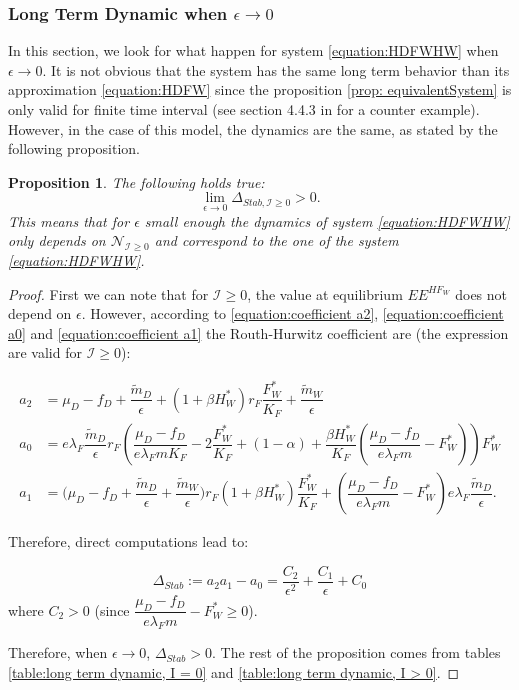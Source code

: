 \documentclass{article}
\newcommand{\lfw}{\lambda_{F}}
\newcommand{\lfw}{\lambda_{F}}
\newcommand{\cI}{\mathcal{I}}
\newtheorem{prop}{Proposition}
\begin{document}
\subsubsection{Long Term Dynamic when $\epsilon \rightarrow 0$}
In this section, we look for what happen for system \eqref{equation:HDFWHW} when $\epsilon \rightarrow 0$. It is not obvious that the system has the same long term behavior than its approximation \eqref{equation:HDFW} since the proposition \ref{prop: equivalentSystem} is only valid for finite time interval (see section 4.4.3 in \cite{banasiak_methods_2014} for a counter example). However, in the case of this model, the dynamics are the same, as stated by the following proposition.

\begin{prop}
The following holds true:
$$
\lim\limits_{ \epsilon \rightarrow 0}{\Delta_{Stab, \cI \geq 0}} > 0.
$$
This means that for $\epsilon$ small enough the dynamics of system \eqref{equation:HDFWHW} only depends on $\mathcal{N}_{\cI \geq 0}$ and correspond to the one of the system \eqref{equation:HDFWHW}.
\end{prop}
\begin{proof}
First we can note that for $\cI \geq 0$, the value at equilibrium $EE^{HF_W}$ does not depend on $\epsilon$. However, according to \eqref{equation:coefficient a2}, \eqref{equation:coefficient a0} and \eqref{equation:coefficient a1} the Routh-Hurwitz coefficient are (the expression are valid for $\cI \geq 0$):

\begin{align*}
a_2  &= \mu_D - f_D + \dfrac{\tilde m_D}{\epsilon} + (1+\beta H_W^*)r_F \dfrac{F_W^*}{K_F} + \dfrac{\tilde m_W}{\epsilon} \\
a_0 &= e \lfw \dfrac{\tilde m_D}{\epsilon} r_F \left(\dfrac{\mu_D -f_D }{e \lfw m K_F} - 2\dfrac{F_W^*}{K_F} + (1-\alpha) + \dfrac{\beta H_W^*}{K_F} \left(\dfrac{\mu_D -f_D }{e \lfw m} - F_W^*\right) \right) F_W^* \\
a_1 &= \Big( \mu_D  -f_D + \dfrac{\tilde m_D}{\epsilon} + \dfrac{\tilde m_W}{\epsilon} \Big) r_F(1+ \beta H_W^*) \dfrac{F^*_W}{K_F} + \left(\dfrac{\mu_D -f_D}{e\lfw m} - F_W^*\right) e \lfw \dfrac{\tilde m_D}{\epsilon}.
\end{align*}

Therefore, direct computations lead to:

\begin{equation*}
\Delta_{Stab} := a_2 a_1 - a_0 = \dfrac{C_2}{\epsilon^2} + \dfrac{C_1}{\epsilon} + C_0
\end{equation*}
where $C_2 > 0$ (since $\dfrac{\mu_D -f_D}{e\lfw m} - F_W^* \geq 0$).


Therefore, when $\epsilon \rightarrow 0$, $\Delta_{Stab} > 0$. The rest of the proposition comes from tables \ref{table:long term dynamic, I = 0} and \ref{table:long term dynamic, I > 0}.
\end{proof}
\end{document}
